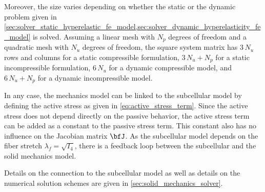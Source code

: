 Moreover, the size varies depending on whether the static or the dynamic problem given in \cref{sec:solver_static_hyperelastic_fe_model,sec:solver_dynamic_hyperelasticity_fe_model} is solved. Assuming a linear mesh with $N_p$ degrees of freedom and a quadratic mesh with $N_u$ degrees of freedom, the square system matrix has $3\,N_u$ rows and columns for a static compressible formulation, $3\,N_u + N_p$ for a static incompressible formulation, $6\,N_u$ for a dynamic compressible model, and $6\,N_u+N_p$ for a dynamic incompressible model.



In any case, the mechanics model can be linked to the subcellular model by defining the active stress as given in \cref{eq:active_stress_term}. Since the active stress does not depend directly on the passive behavior, the active stress term can be added as a constant to the passive stress term. This constant also has no influence on the Jacobian matrix $\bfJ$. As the subcellular model depends on the fiber stretch $\lambda_f = \sqrt{I_4}$, there is a feedback loop between the subcellular and the solid mechanics model.

Details on the connection to the subcellular model as well as details on the numerical solution schemes are given in \cref{sec:solid_mechanics_solver}.



